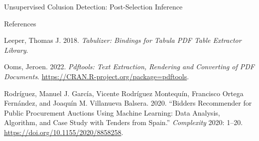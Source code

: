 \documentclass[
  11pt,
  ignorenonframetext,
]{beamer}
\newlength{\cslhangindent}
\newlength{\cslentryspacingunit} %
\newenvironment{CSLReferences}[2] %
 {%
  \setlength{\parindent}{0pt}
  \ifodd #1
  \let\oldpar\par
  \def\par{\hangindent=\cslhangindent\oldpar}
  \fi
  \setlength{\parskip}{#2\cslentryspacingunit}
 }%
 {}
\begin{document}
\begin{frame}{Unsupervised Colusion Detection: Post-Selection Inference}
\protect\hypertarget{unsupervised-colusion-detection-post-selection-inference}{}
\end{frame}

\begin{frame}{References}
\protect\hypertarget{references}{}
\hypertarget{refs}{}
\begin{CSLReferences}{1}{0}
\leavevmode{}%
Leeper, Thomas J. 2018. \emph{Tabulizer: Bindings for Tabula PDF Table
Extractor Library}.

\leavevmode{}%
Ooms, Jeroen. 2022. \emph{Pdftools: Text Extraction, Rendering and
Converting of PDF Documents}.
\url{https://CRAN.R-project.org/package=pdftools}.

\leavevmode{}%
Rodríguez, Manuel J. García, Vicente Rodríguez Montequín, Francisco
Ortega Fernández, and Joaquín M. Villanueva Balsera. 2020. {``Bidders
Recommender for Public Procurement Auctions Using Machine Learning: Data
Analysis, Algorithm, and Case Study with Tenders from Spain.''}
\emph{Complexity} 2020: 1--20.
\url{https://doi.org/10.1155/2020/8858258}.

\end{CSLReferences}
\end{frame}
\end{document}
